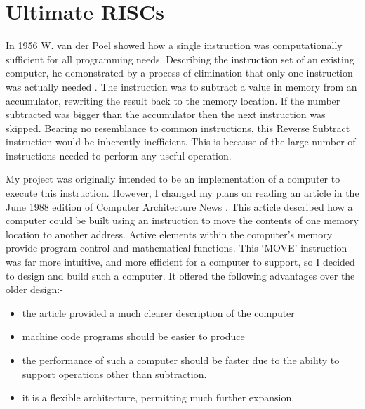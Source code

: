 \section{Ultimate RISCs}

 In 1956 W. van der Poel  showed how a single instruction was computationally sufficient for all programming needs. 
  Describing the instruction set of an existing computer, he
 demonstrated by a process of elimination that  only   one instruction  was actually needed \cite{poel:urisc}.
 The instruction was to subtract a value in memory from an accumulator, rewriting the result back to the memory location.
 If the number subtracted was bigger than the accumulator then the next instruction was skipped. 
Bearing no resemblance to common instructions, this Reverse Subtract instruction would be inherently inefficient. This is because of the large number of instructions needed to perform any useful operation. 
 
My project was originally intended to be an implementation of a computer to execute this instruction.
However, I changed my plans on reading an article in the 
June 1988 edition of Computer Architecture News \cite{jones:urisc}.
This article described how a computer could be built using an instruction to move
the contents of one memory location to another address.
Active elements within the computer's memory provide
program control and mathematical functions.
This `MOVE' instruction was  far more intuitive, and more efficient  for a computer to support,  so I decided to design and build such a computer. 
It offered the following advantages over the older design:-
\begin{itemize}
\item the article provided a much clearer description of the computer
\item machine code programs should be easier to produce
\item the performance of such a computer should be faster due to the ability to
support operations other than subtraction.
 \item it is a  flexible architecture, permitting much further expansion.
\end{itemize}

